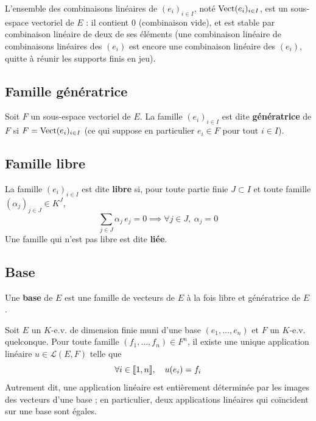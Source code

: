 \begin{defi}
L'ensemble des combinaisons linéaires de $(e_i)_{i\in I}$, noté $\operatorname{Vect}(e_i)_{i\in I}$, est un sous-espace vectoriel de $E$ : il contient $0$ (combinaison vide), et est stable par combinaison linéaire de deux de ses éléments (une combinaison linéaire de combinaisons linéaires des $(e_i)$ est encore une combinaison linéaire des $(e_i)$, quitte à réunir les supports finis en jeu).
\end{defi}

\subsection{Famille génératrice}

\begin{defi}
Soit $F$ un sous-espace vectoriel de $E$. La famille $(e_i)_{i\in I}$ est dite \textbf{génératrice} de $F$ si $F=\operatorname{Vect}(e_i)_{i\in I}$ (ce qui suppose en particulier $e_i\in F$ pour tout $i\in I$).
\end{defi}

\subsection{Famille libre}

\begin{defi}
La famille $(e_i)_{i\in I}$ est dite \textbf{libre} si, pour toute partie finie $J\subset I$ et toute famille $(\alpha_j)_{j\in J}\in K^J$,
\[\sum_{j\in J} \alpha_j\, e_j = 0 \implies \forall j\in J,\ \alpha_j=0\]
Une famille qui n'est pas libre est dite \textbf{liée}.
\end{defi}

\subsection{Base}

\begin{defi}[Base]
Une \textbf{base} de $E$ est une famille de vecteurs de $E$ à la fois libre et génératrice de $E$.
\end{defi}

\begin{prop}
\label{prop:determine-par-base}
Soit $E$ un $K$-e.v. de dimension finie muni d'une base $(e_1,\dots,e_n)$ et $F$ un $K$-e.v. quelconque. Pour toute famille $(f_1,\dots,f_n)\in F^n$, il existe une unique application linéaire $u\in\mathcal{L}(E,F)$ telle que
\[\forall i\in\llbracket 1,n \rrbracket,\quad u(e_i)=f_i\]
Autrement dit, une application linéaire est entièrement déterminée par les images des vecteurs d'une base ; en particulier, deux applications linéaires qui coïncident sur une base sont égales.
\end{prop}

